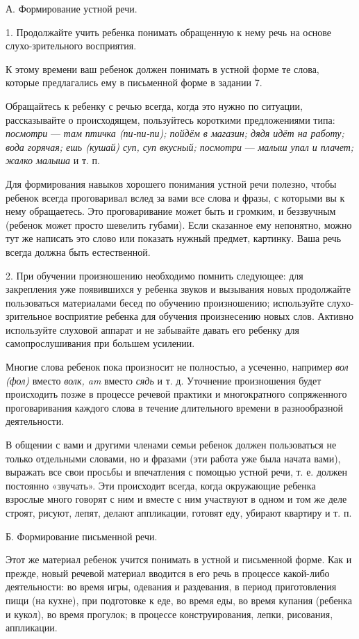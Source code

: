 \documentclass{book}
\renewcommand{\emph}[1]{\textit{#1}}
\begin{document}
А. Формирование устной речи.

1. Продолжайте учить ребенка понимать обращенную к нему речь на основе
слухо-зрительного восприятия.

К этому времени ваш ребенок должен понимать в устной форме те слова,
которые предлагались ему в письменной форме в задании 7.

Обращайтесь к ребенку с речью всегда, когда это нужно по ситуации,
рассказывайте о происходящем, пользуйтесь короткими предложениями типа:
\emph{посмотри} --- \emph{там птичка (пи-пи-пи); пойдём в магазин; дядя
идёт на работу; вода горячая; ешь (кушай) суп, суп вкусный; посмотри}
--- \emph{малыш упал и плачет; жалко малыша} и т. п.

Для формирования навыков хорошего понимания устной речи полезно, чтобы
ребенок всегда проговаривал вслед за вами все слова и фразы, с которыми
вы к нему обращаетесь. Это проговаривание может быть и громким, и
беззвучным (ребенок может просто шевелить губами). Если сказанное ему
непонятно, можно тут же написать это слово или показать нужный предмет,
картинку. Ваша речь всегда должна быть естественной.

2. При обучении произношению необходимо помнить следующее: для
закрепления уже появившихся у ребенка звуков и вызывания новых
продолжайте пользоваться материалами бесед по обучению произношению;
используйте слухо-зрительное восприятие ребенка для обучения
произнесению новых слов. Активно используйте слуховой аппарат и не
забывайте давать его ребенку для самопрослушивания при большем усилении.

Многие слова ребенок пока произносит не полностью, а усеченно, например
\emph{вол (фол)} вместо \emph{волк, am} вместо \emph{сядь} и т. д.
Уточнение произношения будет происходить позже в процессе речевой
практики и многократного сопряженного проговаривания каждого слова в
течение длительного времени в разнообразной деятельности.

В общении с вами и другими членами семьи ребенок должен пользоваться не
только отдельными словами, но и фразами (эти работа уже была начата
вами), выражать все свои просьбы и впечатления с помощью устной речи, т.
е. должен постоянно «звучать». Эти происходит всегда, когда окружающие
ребенка взрослые много говорят с ним и вместе с ним участвуют в одном и
том же деле строят, рисуют, лепят, делают аппликации, готовят еду,
убирают квартиру и т. п.

Б. Формирование письменной речи.

Этот же материал ребенок учится понимать в устной и письменной форме.
Как и прежде, новый речевой материал вводится в его речь в процессе
какой-либо деятельности: во время игры, одевания и раздевания, в период
приготовления пищи (на кухне), при подготовке к еде, во время еды, во
время купания (ребенка и кукол), во время прогулок; в процессе
конструирования, лепки, рисования, аппликации.
\end{document}

